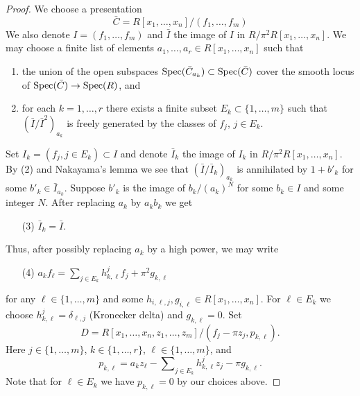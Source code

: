 \begin{proof}
We choose a presentation
$$
\bar C = R[x_1, \ldots, x_n]/(f_1, \ldots, f_m)
$$
We also denote $I = (f_1, \ldots, f_m)$ and $\bar I$ the image of
$I$ in $R/\pi^2R[x_1, \ldots, x_n]$. We may choose a finite list of elements
$a_1, \ldots, a_r \in R[x_1, \ldots, x_n]$ such that
\begin{enumerate}
\item the union of the open subspaces
$\mathop{\rm Spec}(\bar C_{a_k}) \subset \mathop{\rm Spec}(\bar C)$
cover the smooth locus of $\mathop{\rm Spec}(\bar C) \to \mathop{\rm Spec}(R)$, and
\item for each $k = 1, \ldots, r$ there exists a finite subset
$E_k \subset \{1, \ldots, m\}$ such that
$(\bar I/\bar I^2)_{a_k}$ is freely generated by the classes of
$f_j$, $j \in E_k$.
\end{enumerate}
Set $I_k = (f_j, j \in E_k) \subset I$ and denote $\bar I_k$ the
image of $I_k$ in $R/\pi^2R[x_1, \ldots, x_n]$.
By (2) and Nakayama's lemma we see that $(\bar I/\bar I_k)_{a_k}$
is annihilated by $1 + b'_k$ for some $b'_k \in \bar I_{a_k}$.
Suppose $b'_k$ is the image of $b_k/(a_k)^N$ for some $b_k \in I$
and some integer $N$. After replacing $a_k$ by $a_kb_k$ we get
\begin{enumerate}
\item[(3)] $\bar I_k = \bar I$.
\end{enumerate}
Thus, after possibly replacing $a_k$ by a high power, we may write
\begin{enumerate}
\item[(4)]
$a_k f_\ell = \sum\nolimits_{j \in E_k} h_{k, \ell}^jf_j + \pi^2 g_{k, \ell}$
\end{enumerate}
for any $\ell \in \{1, \ldots, m\}$ and some
$h_{i, \ell, j}, g_{i, \ell} \in R[x_1, \ldots, x_n]$.
For $\ell \in E_k$ we choose $h_{k, \ell}^j = \delta_{\ell, j}$ (Kronecker
delta) and $g_{k, \ell} = 0$. Set
$$
D = R[x_1, \ldots, x_n, z_1, \ldots, z_m]/
(f_j - \pi z_j, p_{k, \ell}).
$$
Here $j \in \{1, \ldots, m\}$, $k \in \{1, \ldots, r\}$,
$\ell \in \{1, \ldots, m\}$, and
$$
p_{k, \ell} = a_k z_\ell - \sum\nolimits_{j \in E_k} h_{k, \ell}^j z_j
- \pi g_{k, \ell}.
$$
Note that for $\ell \in E_k$ we have $p_{k, \ell} = 0$ by our choices above.


\end{proof}
